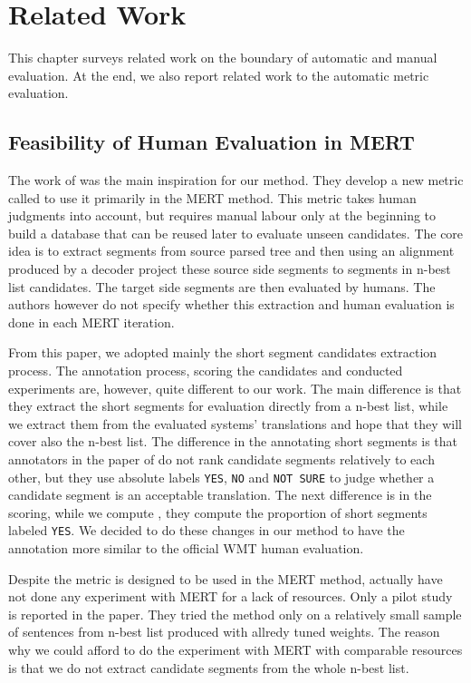 \chapter{Related Work}
\label{chapter:related}

This chapter surveys related work on the boundary of automatic and manual
evaluation. At the end, we also report related work to the automatic metric
evaluation.

\section{Feasibility of Human Evaluation in MERT}

The work of  was the main inspiration for our
 method. They develop a new metric called  to use
it primarily in the MERT method. This metric takes human judgments into
account, but requires manual labour only at the beginning to build a database
that can be reused later to evaluate unseen candidates. The core idea is to
extract segments from source parsed tree and then using an alignment produced
by a decoder project these source side segments to segments in n-best list
candidates.  The target side segments are then evaluated by humans. The authors
however do not specify whether this extraction and human evaluation is done in
each MERT iteration.

From this paper, we adopted mainly the short segment candidates extraction
process. The annotation process, scoring the candidates and conducted
experiments are, however, quite different to our work. The main difference is
that they extract the short segments for evaluation directly from a n-best
list, while we extract them from the evaluated systems' translations and hope
that they will cover also the n-best list. The difference in the annotating
short segments is that annotators in the paper of 
do not rank candidate segments relatively to each other, but they use absolute
labels \texttt{YES}, \texttt{NO} and \texttt{NOT SURE} to judge whether a
candidate segment is an acceptable translation. The next difference is in the
scoring, while we compute , they compute
the proportion of short segments labeled \texttt{YES}.  We decided to do these
changes in our method to have the annotation more similar to the official WMT
human evaluation.

Despite the  metric is designed to be used in the MERT method,
 actually have not done any experiment with MERT
for a lack of resources. Only a pilot study is reported in the paper. They
tried the method only on a relatively small sample of sentences from n-best
list produced with allredy tuned weights. The reason why we could afford to do
the experiment with MERT with comparable resources is that we do not extract
candidate segments from the whole n-best list.


